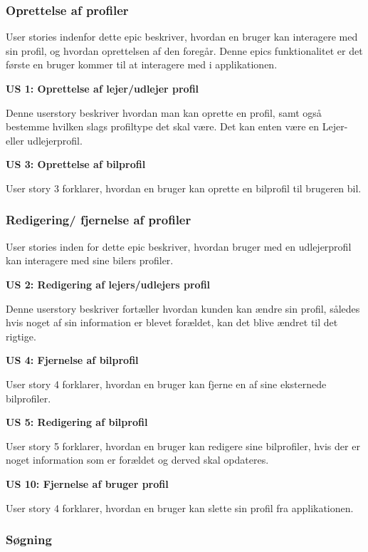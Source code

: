 \documentclass[Rapport/Rapport_main.tex]{subfiles}
\begin{document}
\subsubsection{Oprettelse af profiler}

User stories indenfor dette epic beskriver, hvordan en bruger kan interagere med sin profil, og hvordan oprettelsen af den foregår. Denne epics funktionalitet er det første en bruger kommer til at interagere med i applikationen. 

\textbf{US 1: Oprettelse af lejer/udlejer profil}

Denne userstory beskriver hvordan man kan oprette en profil, samt også bestemme hvilken slags profiltype det skal være. Det kan enten være en Lejer- eller udlejerprofil. 

\textbf{US 3: Oprettelse af bilprofil}

User story 3 forklarer, hvordan en bruger kan oprette en bilprofil til brugeren bil.


\subsubsection{Redigering/ fjernelse af profiler}

User stories inden for dette epic beskriver, hvordan bruger med en udlejerprofil kan interagere med sine bilers profiler.

\textbf{US 2: Redigering af lejers/udlejers profil}

Denne userstory beskriver fortæller hvordan kunden kan ændre sin profil, således hvis noget af sin information er blevet forældet, kan det blive ændret til det rigtige.

\textbf{US 4: Fjernelse af bilprofil}

User story 4 forklarer, hvordan en bruger kan fjerne en af sine eksternede bilprofiler. 

\textbf{US 5: Redigering af bilprofil}

User story 5 forklarer, hvordan en bruger kan redigere sine bilprofiler, hvis der er noget information som er forældet og derved skal opdateres.

\textbf{US 10: Fjernelse af bruger profil}

User story 4 forklarer, hvordan en bruger kan slette sin profil fra applikationen. 


\subsubsection{Søgning}
\end{document}

